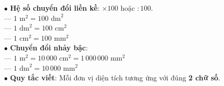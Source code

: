 \documentclass[14pt,a4paper,oneside]{extbook}
\begin{document}
\begin{minipage}[t]{0.49\textwidth}
  \begin{tcolorbox}[
    enhanced,
    title={\footnotesize\bfseries\color{white}\faExchange\ 2. Mối quan hệ giữa các đơn vị},
    colback=teal!2!white,
    colframe=teal!75!black,
    arc=2.5mm, boxrule=0.8pt, top=1.8mm, bottom=1.8mm, left=2mm, right=2mm
  ]
    \footnotesize
    $\bullet$ \textbf{Hệ số chuyển đổi liền kề}: $\times 100$ hoặc $: 100$.\\
    --- $1\text{ m}^2 = 100\text{ dm}^2$\\
    --- $1\text{ dm}^2 = 100\text{ cm}^2$\\
    --- $1\text{ cm}^2 = 100\text{ mm}^2$\\[1mm]
    $\bullet$ \textbf{Chuyển đổi nhảy bậc}:\\
    --- $1\text{ m}^2 = 10\,000\text{ cm}^2 = 1\,000\,000\text{ mm}^2$\\
    --- $1\text{ dm}^2 = 10\,000\text{ mm}^2$\\
    $\bullet$ \textbf{Quy tắc viết}: Mỗi đơn vị diện tích tương ứng với đúng \textbf{2 chữ số}.
  \end{tcolorbox}
\end{minipage}

\vspace{2mm}
\end{document}
